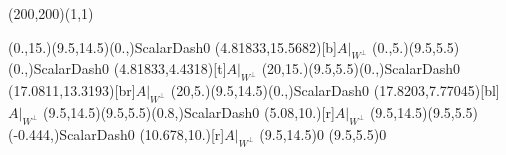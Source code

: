 \unitlength=1bp%

\begin{feynartspicture}(200,200)(1,1)

\FADiagram{}
\FAProp(0.,15.)(9.5,14.5)(0.,){ScalarDash}{0}
\FALabel(4.81833,15.5682)[b]{$A|_{W^\perp}$}
\FAProp(0.,5.)(9.5,5.5)(0.,){ScalarDash}{0}
\FALabel(4.81833,4.4318)[t]{$A|_{W^\perp}$}
\FAProp(20,15.)(9.5,5.5)(0.,){ScalarDash}{0}
\FALabel(17.0811,13.3193)[br]{$A|_{W^\perp}$}
\FAProp(20,5.)(9.5,14.5)(0.,){ScalarDash}{0}
\FALabel(17.8203,7.77045)[bl]{$A|_{W^\perp}$}
\FAProp(9.5,14.5)(9.5,5.5)(0.8,){ScalarDash}{0}
\FALabel(5.08,10.)[r]{$A|_{W^\perp}$}
\FAProp(9.5,14.5)(9.5,5.5)(-0.444,){ScalarDash}{0}
\FALabel(10.678,10.)[r]{$A|_{W^\perp}$}
\FAVert(9.5,14.5){0}
\FAVert(9.5,5.5){0}
\end{feynartspicture}

